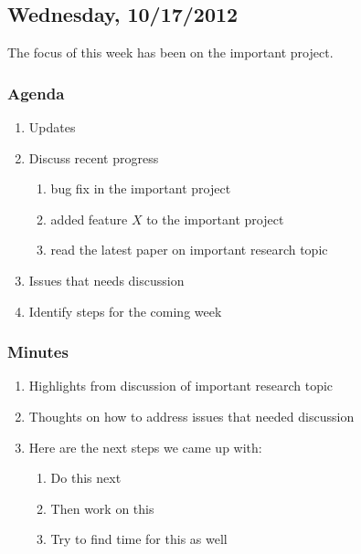 \subsection{Wednesday, 10/17/2012}

The focus of this week has been on the important project.

\subsubsection{Agenda}

\begin{enumerate}

    \item Updates

    \item Discuss recent progress

        \begin{enumerate}

            \item bug fix in the important project

            \item added feature $X$ to the important project

            \item read the latest paper on important research topic

        \end{enumerate}

    \item Issues that needs discussion

    \item Identify steps for the coming week

\end{enumerate}

\subsubsection{Minutes}

\begin{enumerate}

    \item Highlights from discussion of important research topic

    \item Thoughts on how to address issues that needed discussion

    \item Here are the next steps we came up with:

        \begin{enumerate}

            \item Do this next

            \item Then work on this

            \item Try to find time for this as well

        \end{enumerate}

\end{enumerate}

